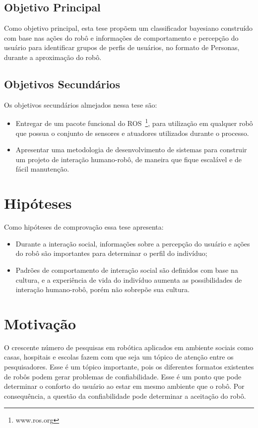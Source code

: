 \subsection{Objetivo Principal}
Como objetivo principal, esta tese propõem um classificador bayesiano construído com base nas ações do robô e informações de comportamento e percepção do usuário para identificar grupos de perfis de usuários, no formato de Personas, durante a aproximação do robô.

\subsection{Objetivos Secundários}
Os objetivos secundários almejados nessa tese são:

\begin{itemize}
    \item Entregar de um pacote funcional do ROS~\footnote{www.ros.org}, para utilização em qualquer robô que possua o conjunto de sensores e atuadores utilizados durante o processo.
    \item Apresentar uma metodologia de desenvolvimento de sistemas para construir um projeto de interação humano-robô, de maneira que fique escalável e de fácil manutenção.
\end{itemize}

\section{Hipóteses}
Como hipóteses de comprovação essa tese apresenta:

\begin{itemize}
    \item Durante a interação social, informações sobre a percepção do usuário e ações do robô são importantes para determinar o perfil do indivíduo;
    \item Padrões de comportamento de interação social são definidos com base na cultura, e a experiência de vida do indivíduo aumenta as possibilidades de interação humano-robô, porém não sobrepõe sua cultura.
\end{itemize}

\section{Motivação}
O crescente número de pesquisas em robótica aplicados em ambiente sociais como casas, hospitais e escolas fazem com que seja um tópico de atenção entre os pesquisadores. Esse é um tópico importante, pois os diferentes formatos existentes de robôs podem gerar problemas de confiabilidade. Esse é um ponto que pode determinar o conforto do usuário ao estar em mesmo ambiente que o robô. Por consequência, a questão da confiabilidade pode determinar a aceitação do robô.

